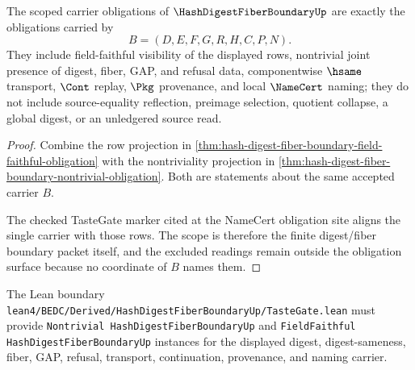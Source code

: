 \begin{theorem}
\label{thm:hash-digest-fiber-boundary-obligation-scope}
The scoped carrier obligations of $\HashDigestFiberBoundaryUp$ are exactly the obligations carried by
$$
B=(D,E,F,G,R,H,C,P,N).
$$
They include field-faithful visibility of the displayed rows, nontrivial joint presence of digest, fiber, GAP, and refusal data, componentwise $\hsame$ transport, $\Cont$ replay, $\Pkg$ provenance, and local $\NameCert$ naming; they do not include source-equality reflection, preimage selection, quotient collapse, a global digest, or an unledgered source read.
\end{theorem}
\begin{proof}
Combine the row projection in \autoref{thm:hash-digest-fiber-boundary-field-faithful-obligation} with the nontriviality projection in \autoref{thm:hash-digest-fiber-boundary-nontrivial-obligation}. Both are statements about the same accepted carrier $B$.

The checked TasteGate marker cited at the NameCert obligation site aligns the single carrier with those rows. The scope is therefore the finite digest/fiber boundary packet itself, and the excluded readings remain outside the obligation surface because no coordinate of $B$ names them.
\end{proof}



The Lean boundary \texttt{lean4/BEDC/Derived/HashDigestFiberBoundaryUp/TasteGate.lean} must provide \texttt{Nontrivial HashDigestFiberBoundaryUp} and \texttt{FieldFaithful HashDigestFiberBoundaryUp} instances for the displayed digest, digest-sameness, fiber, GAP, refusal, transport, continuation, provenance, and naming carrier.


